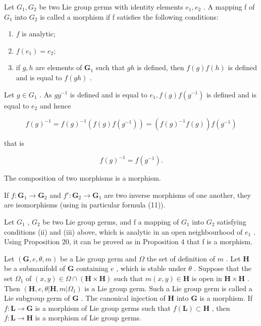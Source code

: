 Let \(G_{1}, G_{2}\) be two Lie group germs with identity elements \(e_{1}, e_{2}\) . A mapping f of \(G_{1}\) into \(G_{2}\) is called a morphism if f satisfies the following conditions:

\begin{enumerate}
\def\labelenumi{(\roman{enumi})}
\item
  \(f\) is analytic;
\item
  \(f(e_{1}) = e_{2};\)
\item
  if \(g, h\) are elements of \(\mathbf{G}_1\) such that \(gh\) is defined, then \(f(g)f(h)\) is defined and is equal to \(f(gh)\) .
\end{enumerate}

Let \(g \in G_1\) . As \(gg^{-1}\) is defined and is equal to \(e_1, f(g)f(g^{-1})\) is defined and is equal to \(e_2\) and hence

\[
f (g) ^ {- 1} = f (g) ^ {- 1} \left(f (g) f \left(g ^ {- 1}\right)\right) = \left(f (g) ^ {- 1} f (g)\right) f \left(g ^ {- 1}\right)
\]

that is

\[
f (g) ^ {- 1} = f (g ^ {- 1}).\tag{11}
\]

The composition of two morphisms is a morphism.

If \(f: \mathbf{G}_1 \to \mathbf{G}_2\) and \(f': \mathbf{G}_2 \to \mathbf{G}_1\) are two inverse morphisms of one another, they are isomorphisms (using in particular formula (11)).

Let \(G_{1}\) , \(G_{2}\) be two Lie group germs, and f a mapping of \(G_{1}\) into \(G_{2}\) satisfying conditions (ii) and (iii) above, which is analytic in an open neighbourhood of \(e_{1}\) . Using Proposition 20, it can be proved as in Proposition 4 that f is a morphism.

Let \((\mathbf{G}, e, \theta, m)\) be a Lie group germ and \(\Omega\) the set of definition of \(m\) . Let \(\mathbf{H}\) be a submanifold of \(\mathbf{G}\) containing \(e\) , which is stable under \(\theta\) . Suppose that the set \(\Omega_1\) of \((x, y) \in \Omega \cap (\mathbf{H} \times \mathbf{H})\) such that \(m(x, y) \in \mathbf{H}\) is open in \(\mathbf{H} \times \mathbf{H}\) . Then \((\mathbf{H}, e, \theta | \mathbf{H}, m | \Omega_1)\) is a Lie group germ. Such a Lie group germ is called a Lie subgroup germ of \(\mathbf{G}\) . The canonical injection of \(\mathbf{H}\) into \(\mathbf{G}\) is a morphism. If \(f: \mathbf{L} \to \mathbf{G}\) is a morphism of Lie group germs such that \(f(\mathbf{L}) \subset \mathbf{H}\) , then \(f: \mathbf{L} \to \mathbf{H}\) is a morphism of Lie group germs.

